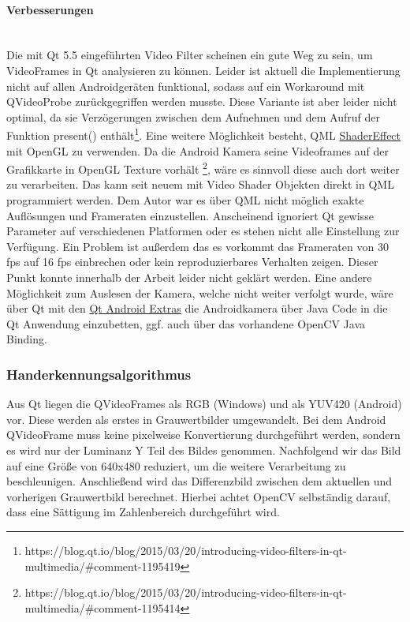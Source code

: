 \paragraph{Verbesserungen}$\;$\\
Die mit Qt 5.5 eingeführten Video Filter scheinen ein gute Weg zu sein, um VideoFrames in Qt analysieren zu können. Leider ist aktuell die Implementierung nicht auf allen Androidgeräten funktional, sodass auf ein Workaround mit QVideoProbe zurückgegriffen werden musste. Diese Variante ist aber leider nicht optimal, da sie Verzögerungen zwischen dem Aufnehmen und dem Aufruf der Funktion present() enthält\footnote{https://blog.qt.io/blog/2015/03/20/introducing-video-filters-in-qt-multimedia/\#comment-1195419}. Eine weitere Möglichkeit besteht, QML \href{http://doc.qt.io/qt-5/qml-qtquick-shadereffect.html}{ShaderEffect} mit OpenGL zu verwenden. Da die Android Kamera seine Videoframes auf der Grafikkarte in OpenGL Texture vorhält \footnote{https://blog.qt.io/blog/2015/03/20/introducing-video-filters-in-qt-multimedia/\#comment-1195414}, wäre es sinnvoll diese auch dort weiter zu verarbeiten. Das kann seit neuem mit Video Shader Objekten direkt in QML programmiert werden.
Dem Autor war es über QML nicht möglich exakte Auflösungen und Frameraten einzustellen. Anscheinend ignoriert Qt gewisse Parameter auf verschiedenen Platformen oder es stehen nicht alle Einstellung zur Verfügung. Ein Problem ist außerdem das es vorkommt das Frameraten von 30 fps auf 16 fps einbrechen oder kein reproduzierbares Verhalten zeigen. Dieser Punkt konnte innerhalb der Arbeit leider nicht geklärt werden.
Eine andere Möglichkeit zum Auslesen der Kamera, welche nicht weiter verfolgt wurde, wäre über Qt mit den \href{http://doc.qt.io/qt-5/qtandroidextras-module.html}{Qt Android Extras} die Androidkamera über Java Code in die Qt Anwendung einzubetten, ggf. auch über das vorhandene OpenCV Java Binding. 

\subsubsection{Handerkennungsalgorithmus}
Aus Qt liegen die QVideoFrames als RGB (Windows) und als YUV420 (Android) vor. Diese werden als erstes in Grauwertbilder umgewandelt. Bei dem Android QVideoFrame muss keine pixelweise Konvertierung durchgeführt werden, sondern es wird nur der Luminanz Y Teil des Bildes genommen. Nachfolgend wir das Bild auf eine Größe von 640x480 reduziert, um die weitere Verarbeitung zu beschleunigen. Anschließend wird das Differenzbild zwischen dem aktuellen und vorherigen Grauwertbild berechnet. Hierbei achtet OpenCV selbständig darauf, dass eine Sättigung im Zahlenbereich durchgeführt wird.

